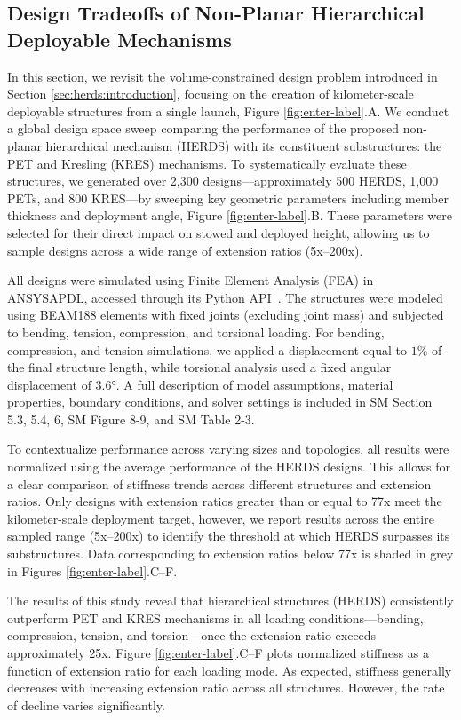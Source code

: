 \subsection{Design Tradeoffs of {Non-Planar Hierarchical Deployable}  Mechanisms}
{In this section, we revisit the volume-constrained design problem introduced in Section \ref{sec:herds:introduction}, focusing on the creation of kilometer-scale deployable structures from a single launch, Figure \ref{fig:enter-label}.A. We conduct a global design space sweep comparing the performance of the proposed non-planar hierarchical mechanism (HERDS) with its constituent substructures: the PET and Kresling (KRES) mechanisms. To systematically evaluate these structures, we generated over 2,300 designs—approximately 500 HERDS, 1,000 PETs, and 800 KRES—by sweeping key geometric parameters including member thickness and deployment angle, Figure \ref{fig:enter-label}.B. These parameters were selected for their direct impact on stowed and deployed height, allowing us to sample designs across a wide range of extension ratios (5x–200x).}

{All designs were simulated using Finite Element Analysis (FEA) in ANSYS\textregistered APDL\cite{ansys_inc_ansys_nodate}, accessed through its Python API~\cite{alexander_kaszynski_2020_4009467}. The structures were modeled using BEAM188 elements with fixed joints (excluding joint mass) and subjected to bending, tension, compression, and torsional loading. For bending, compression, and tension simulations, we applied a displacement equal to $1\%$ of the final structure length, while torsional analysis used a fixed angular displacement of 3.6°. A full description of model assumptions, material properties, boundary conditions, and solver settings is included in SM Section 5.3, 5.4, 6, SM Figure 8-9, and SM Table 2-3.}

{To contextualize performance across varying sizes and topologies, all results were normalized using the average performance of the HERDS designs. This allows for a clear comparison of stiffness trends across different structures and extension ratios. Only designs with extension ratios greater than or equal to 77x meet the kilometer-scale deployment target, however, we report results across the entire sampled range (5x–200x) to identify the threshold at which HERDS surpasses its substructures. Data corresponding to extension ratios below 77x is shaded in grey in Figures \ref{fig:enter-label}.C–F.}

{The results of this study reveal that hierarchical structures (HERDS) consistently outperform PET and KRES mechanisms in all loading conditions—bending, compression, tension, and torsion—once the extension ratio exceeds approximately 25x. Figure \ref{fig:enter-label}.C–F plots normalized stiffness as a function of extension ratio for each loading mode. As expected, stiffness generally decreases with increasing extension ratio across all structures. However, the rate of decline varies significantly.}

